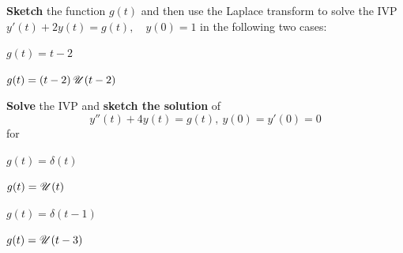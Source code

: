     \begin{question}
      \textbf{Sketch} the function \(g(t)\) and then use the Laplace transform to solve the IVP
      \(
        y'(t) + 2 y(t) = g(t),\quad y(0)=1
      \)
      in the following two cases:
      \begin{fullwidth}
      \begin{colenumerate}[2]
      \item \(g(t) = t-2\)
      \item \(g(t) = (t-2)\operatorname{\mathscr{U}}(t-2)\)
      \end{colenumerate}
    \end{fullwidth}
    \solspace{0.2in}
    \end{question}

    \begin{question}
      \begin{fullwidth}
      \textbf{Solve} the IVP and \textbf{sketch the solution} of
      \[
        y''(t) + 4 y(t) = g(t),\ y(0)=y'(0)=0
      \]
      for

      \begin{colenumerate}[2]
      \item \(g(t) = \delta(t)\) \solspace{.25in}
      \item \(g(t) = \operatorname{\mathscr{U}}(t)\) \solspace{.25in}
      \item \(g(t) = \delta(t-1)\) \solspace{.25in}
      \item \(g(t) = \operatorname{\mathscr{U}}(t-3)\) \solspace{.25in}
      \end{colenumerate}
    \end{fullwidth}

    \end{question}

